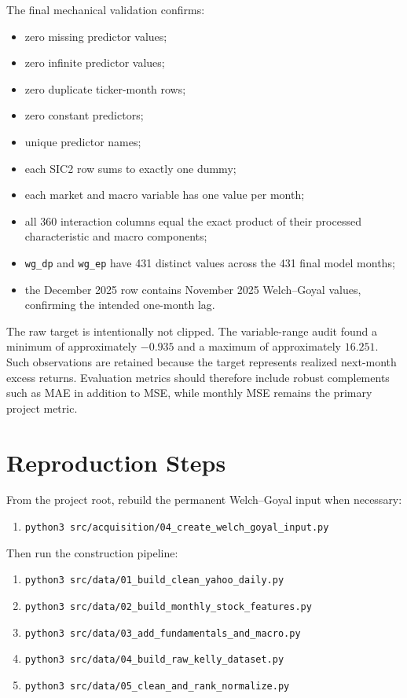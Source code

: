 \documentclass[11pt,a4paper]{article}
\newcommand{\code}[1]{\texttt{#1}}
\begin{document}
The final mechanical validation confirms:
\begin{itemize}
  \item zero missing predictor values;
  \item zero infinite predictor values;
  \item zero duplicate ticker-month rows;
  \item zero constant predictors;
  \item unique predictor names;
  \item each SIC2 row sums to exactly one dummy;
  \item each market and macro variable has one value per month;
  \item all 360 interaction columns equal the exact product of their processed characteristic and macro components;
  \item \code{wg\_dp} and \code{wg\_ep} have 431 distinct values across the 431 final model months;
  \item the December 2025 row contains November 2025 Welch--Goyal values, confirming the intended one-month lag.
\end{itemize}

The raw target is intentionally not clipped. The variable-range audit found a minimum of approximately $-0.935$ and a maximum of approximately $16.251$. Such observations are retained because the target represents realized next-month excess returns. Evaluation metrics should therefore include robust complements such as MAE in addition to MSE, while monthly MSE remains the primary project metric.

\section{Reproduction Steps}

From the project root, rebuild the permanent Welch--Goyal input when necessary:
\begin{enumerate}
  \item \code{python3 src/acquisition/04\_create\_welch\_goyal\_input.py}
\end{enumerate}

Then run the construction pipeline:
\begin{enumerate}
  \item \code{python3 src/data/01\_build\_clean\_yahoo\_daily.py}
  \item \code{python3 src/data/02\_build\_monthly\_stock\_features.py}
  \item \code{python3 src/data/03\_add\_fundamentals\_and\_macro.py}
  \item \code{python3 src/data/04\_build\_raw\_kelly\_dataset.py}
  \item \code{python3 src/data/05\_clean\_and\_rank\_normalize.py}
\end{enumerate}
\end{document}
